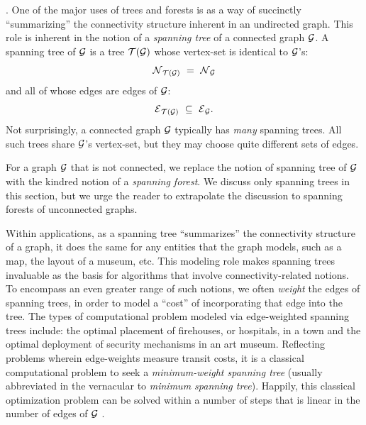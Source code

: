   

.
One of the major uses of trees and forests is as a way of succinctly ``summarizing'' the connectivity structure inherent in an undirected graph.  This role is inherent in the notion of a {\it spanning tree} of a connected graph $\mbox{$\cal G$}$.  A spanning tree of $\mbox{$\cal G$}$ is a tree $\mbox{$\cal T$}(\mbox{$\cal G$})$ whose vertex-set is identical to $\mbox{$\cal G$}$'s:
\[ \mbox{$\cal N$}_{\mbox{{\scriptsize $\cal T$}}(\mbox{{\scriptsize $\cal G$}})} \ = \ \mbox{$\cal N$}_{\mbox{{\scriptsize $\cal G$}}} \]
and all of whose edges are edges of $\mbox{$\cal G$}$:
\[ \mbox{$\cal E$}_{\mbox{{\scriptsize $\cal T$}}(\mbox{{\scriptsize $\cal G$}})} \ \subseteq \ \mbox{$\cal E$}_{\mbox{{\scriptsize $\cal G$}}}. \]
Not surprisingly, a connected graph $\mbox{$\cal G$}$  typically has {\em many} spanning trees.  All such trees share $\mbox{$\cal G$}$'s vertex-set, but they may choose quite different sets of edges.

\smallskip

 

For a graph $\mbox{$\cal G$}$ that is not connected, we replace the notion of spanning tree of $\mbox{$\cal G$}$ with the kindred notion of a {\it spanning forest}.  We discuss only spanning trees in this section, but we urge the reader to extrapolate the discussion to spanning forests of unconnected graphs.

\smallskip

 

Within applications, as a spanning tree ``summarizes'' the connectivity structure of a graph, it does the same for any entities that the graph models, such as a map, the layout of a museum, etc.  This modeling role makes spanning trees invaluable as the basis for algorithms that involve connectivity-related notions.  To encompass an even greater range of such notions, we often {\it weight} the edges of spanning trees, in order to model a ``cost'' of incorporating that edge into the tree.  The types of computational problem modeled via edge-weighted spanning trees include: the optimal placement of firehouses, or hospitals, in a town and the optimal deployment of security mechanisms in an art museum.  Reflecting problems wherein edge-weights measure transit costs, it is a classical computational problem to seek a {\em minimum-weight spanning tree} (usually abbreviated in the vernacular to {\em minimum spanning tree}).  Happily, this classical optimization problem can be solved within a number of steps that is linear in the number of edges of $\mbox{$\cal G$}$ \cite{CLRS}.


